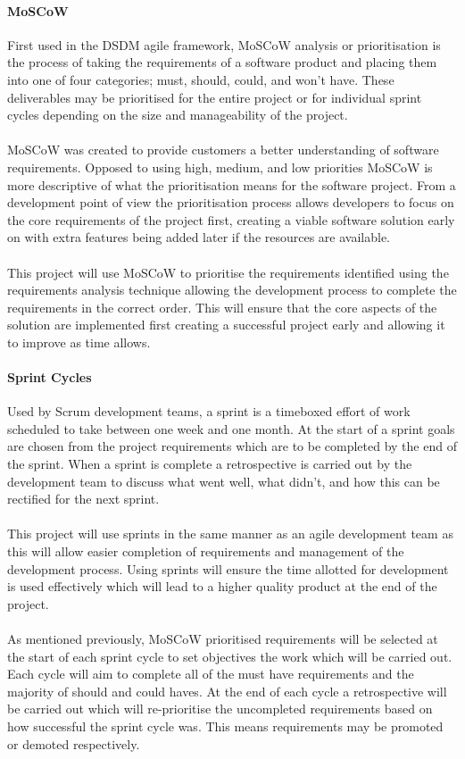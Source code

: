 		\paragraph{MoSCoW}
			First used in the DSDM agile framework, MoSCoW analysis or prioritisation is the process of taking the requirements of a software product and placing them into one of four categories; must, should, could, and won't have. These deliverables may be prioritised for the entire project or for individual sprint cycles depending on the size and manageability of the project.
			\\\\
			MoSCoW was created to provide customers a better understanding of software requirements. Opposed to using high, medium, and low priorities MoSCoW is more descriptive of what the prioritisation means for the software project. From a development point of view the prioritisation process allows developers to focus on the core requirements of the project first, creating a viable software solution early on with extra features being added later if the resources are available.
			\\\\
			This project will use MoSCoW to prioritise the requirements identified using the requirements analysis technique allowing the development process to complete the requirements in the correct order. This will ensure that the core aspects of the solution are implemented first creating a successful project early and allowing it to improve as time allows.
		\paragraph{Sprint Cycles}
			Used by Scrum development teams, a sprint is a timeboxed effort of work scheduled to take between one week and one month. At the start of a sprint goals are chosen from the project requirements which are to be completed by the end of the sprint. When a sprint is complete a retrospective is carried out by the development team to discuss what went well, what didn't, and how this can be rectified for the next sprint.
			\\\\
			This project will use sprints in the same manner as an agile development team as this will allow easier completion of requirements and management of the development process. Using sprints will ensure the time allotted for development is used effectively which will lead to a higher quality product at the end of the project.
			\\\\
			As mentioned previously, MoSCoW prioritised requirements will be selected at the start of each sprint cycle to set objectives the work which will be carried out. Each cycle will aim to complete all of the must have requirements and the majority of should and could haves. At the end of each cycle a retrospective will be carried out which will re-prioritise the uncompleted requirements based on how successful the sprint cycle was. This means requirements may be promoted or demoted respectively.
